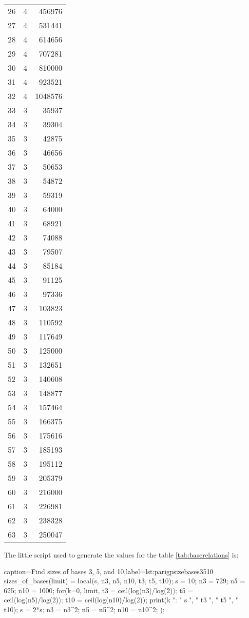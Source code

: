 \documentclass[a4paper,10pt]{article}
\theoremstyle{plain} %
\theoremstyle{definition}
\theoremstyle{remark}
\begin{document}
\begin{center}
\begin{longtable}{r r r}
26 & 4 & 456976\\
27 & 4 & 531441\\
28 & 4 & 614656\\
29 & 4 & 707281\\
30 & 4 & 810000\\
31 & 4 & 923521\\
32 & 4 & 1048576\\
33 & 3 & 35937\\
34 & 3 & 39304\\
35 & 3 & 42875\\
36 & 3 & 46656\\
37 & 3 & 50653\\
38 & 3 & 54872\\
39 & 3 & 59319\\
40 & 3 & 64000\\
41 & 3 & 68921\\
42 & 3 & 74088\\
43 & 3 & 79507\\
44 & 3 & 85184\\
45 & 3 & 91125\\
46 & 3 & 97336\\
47 & 3 & 103823\\
48 & 3 & 110592\\
49 & 3 & 117649\\
50 & 3 & 125000\\
51 & 3 & 132651\\
52 & 3 & 140608\\
53 & 3 & 148877\\
54 & 3 & 157464\\
55 & 3 & 166375\\
56 & 3 & 175616\\
57 & 3 & 185193\\
58 & 3 & 195112\\
59 & 3 & 205379\\
60 & 3 & 216000\\
61 & 3 & 226981\\
62 & 3 & 238328\\
63 & 3 & 250047\\
\end{longtable}
\label{tab:startvaluesn}
\end{center}

The little script used to generate the values for the table \ref{tab:baserelations} is:

\lstset{language=parigp}
\begin{pblisting}{caption={Find sizes of bases 3, 5, and 10},label=lst:parigpsizebases3510}
sizes_of_bases(limit) = {
   local(s, n3, n5, n10, t3, t5, t10);
   s = 10;
   n3 = 729;
   n5 = 625;
   n10 = 1000;
   for(k=0, limit,
      t3 = ceil(log(n3)/log(2));
      t5 = ceil(log(n5)/log(2));
      t10 = ceil(log(n10)/log(2));
      print(k ": " s ", " t3 ", " t5 ", " t10);
      s = 2*s;
      n3 = n3^2;
      n5 = n5^2;
      n10 = n10^2;
  );
}
\end{pblisting}
\end{document}
